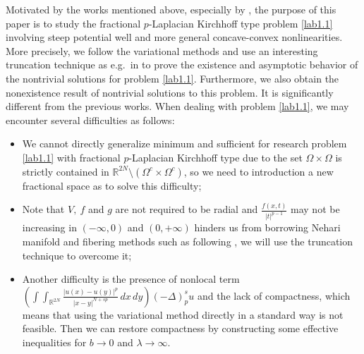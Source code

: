 \documentclass[reqno]{amsart}
\begin{document}
Motivated by the works mentioned above, especially by  \cite{r16, r19, r21, r33}, 
the purpose of this paper is to study the fractional $p$-Laplacian Kirchhoff type 
problem \eqref{lab1.1} involving steep potential well and more general concave-convex 
nonlinearities. More precisely, we follow the variational methods and use an 
interesting truncation technique as e.g.\ in  \cite{r16} to prove the existence 
and asymptotic behavior of the nontrivial solutions for problem \eqref{lab1.1}. 
Furthermore, we also obtain the nonexistence result of nontrivial solutions to this
problem. It is significantly different from the previous works. When dealing with 
problem \eqref{lab1.1}, we may encounter several difficulties as follows:
\begin{itemize}
\item[(1)] We cannot directly generalize minimum and sufficient for research problem 
\eqref{lab1.1} with
fractional $p$-Laplacian Kirchhoff type due to the set $\Omega\times\Omega$ is strictly 
contained in $\mathbb{R}^{2N}\setminus(\Omega^c\times\Omega^c)$, so we need to 
introduction a new fractional space as \cite{r9, r22, r31} to solve this difficulty;

\item[(2)] Note that $V, ~f$ and $g$ are not required to be radial and 
$\frac{f(x,t)}{|t|^{p-1}}$ may not be increasing in $(-\infty, 0)$
and $(0, +\infty)$ hinders us from borrowing Nehari manifold and fibering methods
such as following \cite{r9, r24, r27}, we will use the truncation technique to
 overcome it;

\item[(3)] Another difficulty is the presence of nonlocal term
$(\int\int_{\mathbb{R}^{2N}}\frac{|u(x)-u(y)|^p}{|x-y|^{N+sp}}\,dx\,dy)(-\Delta)_p^s u$
and the lack of compactness, which means that using the variational method directly 
in a standard way is not feasible. Then we can restore compactness by constructing 
some effective inequalities for $b\to 0$ and $\lambda\to \infty$.
\end{itemize}
\end{document}
